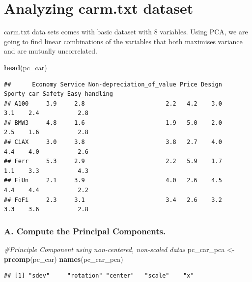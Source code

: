 \documentclass[]{article}
\newenvironment{Shaded}{\begin{snugshade}}{\end{snugshade}}
\newcommand{\KeywordTok}[1]{\textcolor[rgb]{0.13,0.29,0.53}{\textbf{#1}}}
\newcommand{\StringTok}[1]{\textcolor[rgb]{0.31,0.60,0.02}{#1}}
\newcommand{\CommentTok}[1]{\textcolor[rgb]{0.56,0.35,0.01}{\textit{#1}}}
\newcommand{\NormalTok}[1]{#1}
\begin{document}
\section{Analyzing carm.txt dataset}\label{analyzing-carm.txt-dataset}

carm.txt data sets comes with basic dataset with 8 variables. Using PCA,
we are going to find linear combinations of the variables that both
maximises variance and are mutually uncorrelated.

\begin{Shaded}
\begin{Highlighting}[]
\KeywordTok{head}\NormalTok{(pc_car)}
\end{Highlighting}
\end{Shaded}

\begin{verbatim}
##      Economy Service Non-depreciation_of_value Price Design Sporty_car Safety Easy_handling
## A100     3.9     2.8                       2.2   4.2    3.0        3.1    2.4           2.8
## BMW3     4.8     1.6                       1.9   5.0    2.0        2.5    1.6           2.8
## CiAX     3.0     3.8                       3.8   2.7    4.0        4.4    4.0           2.6
## Ferr     5.3     2.9                       2.2   5.9    1.7        1.1    3.3           4.3
## FiUn     2.1     3.9                       4.0   2.6    4.5        4.4    4.4           2.2
## FoFi     2.3     3.1                       3.4   2.6    3.2        3.3    3.6           2.8
\end{verbatim}

\subsubsection{\texorpdfstring{A. Compute the Principal Components.
}{A. Compute the Principal Components.  }}\label{a.-compute-the-principal-components.}

\begin{Shaded}
\begin{Highlighting}[]
\CommentTok{#Principle Component using non-centered, non-scaled datas}
\NormalTok{pc_car_pca <-}\StringTok{ }\KeywordTok{prcomp}\NormalTok{(pc_car)}
\KeywordTok{names}\NormalTok{(pc_car_pca)}
\end{Highlighting}
\end{Shaded}

\begin{verbatim}
## [1] "sdev"     "rotation" "center"   "scale"    "x"
\end{verbatim}
\end{document}
